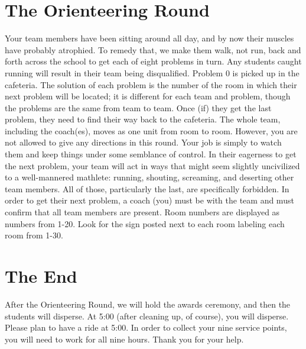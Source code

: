 \documentclass[11pt]{article}
\begin{document}
\begin{small}
\section{The Orienteering Round}
\noindent Your team members have been sitting around all day, and by now their muscles have probably atrophied. To remedy that, we make them walk, not run, back and forth across the school to get each of eight problems in turn. Any students caught running will result in their team being disqualified. Problem 0 is picked up in the cafeteria. The solution of each problem is the number of the room in which their next problem will be located; it is different for each team and problem, though the problems are the same from team to team. Once (if) they get the last problem, they need to find their way back to the cafeteria. The whole team, including the coach(es), moves as one unit from room to room. However, you are not allowed to give any directions in this round.  Your job is simply to watch them and keep things under some semblance of control.  In their eagerness to get the next problem, your team will act in ways that might seem slightly uncivilized to a well-mannered mathlete: running, shouting, screaming, and deserting other team members. All of those, particularly the last, are specifically forbidden. In order to get their next problem, a coach (you) must be with the team and must confirm that all team members are present. Room numbers are displayed as numbers from 1-20. Look for the sign posted next to each room labeling each room from 1-30.

\section{The End}
\noindent After the Orienteering Round, we will hold the awards ceremony, and then the students will disperse. At 5:00 (after cleaning up, of course), you will disperse. Please plan to have a ride at 5:00. In order to collect your nine service points, you will need to work for all nine hours. Thank you for your help.

\end{small}	
\end{document}
